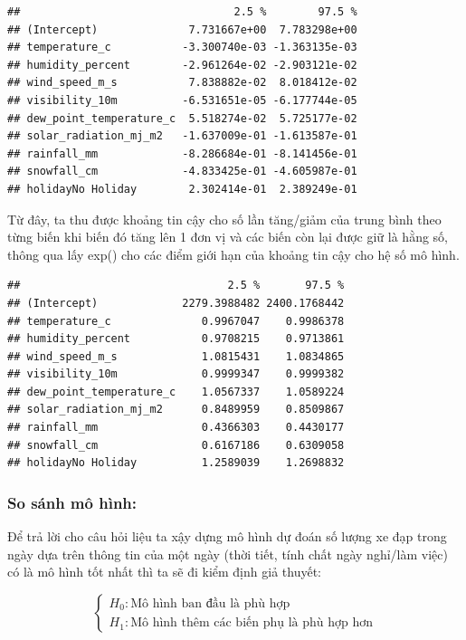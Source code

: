 \documentclass[
  11pt,
  letterpaper,
]{article}
\begin{document}
\begin{verbatim}
##                                 2.5 %        97.5 %
## (Intercept)              7.731667e+00  7.783298e+00
## temperature_c           -3.300740e-03 -1.363135e-03
## humidity_percent        -2.961264e-02 -2.903121e-02
## wind_speed_m_s           7.838882e-02  8.018412e-02
## visibility_10m          -6.531651e-05 -6.177744e-05
## dew_point_temperature_c  5.518274e-02  5.725177e-02
## solar_radiation_mj_m2   -1.637009e-01 -1.613587e-01
## rainfall_mm             -8.286684e-01 -8.141456e-01
## snowfall_cm             -4.833425e-01 -4.605987e-01
## holidayNo Holiday        2.302414e-01  2.389249e-01
\end{verbatim}

Từ đây, ta thu được khoảng tin cậy cho số lần tăng/giảm của trung bình theo từng biến khi biến đó tăng lên 1 đơn vị và các biến còn lại được giữ là hằng số, thông qua lấy exp() cho các điểm giới hạn của khoảng tin cậy cho hệ số mô hình.

\begin{verbatim}
##                                2.5 %       97.5 %
## (Intercept)             2279.3988482 2400.1768442
## temperature_c              0.9967047    0.9986378
## humidity_percent           0.9708215    0.9713861
## wind_speed_m_s             1.0815431    1.0834865
## visibility_10m             0.9999347    0.9999382
## dew_point_temperature_c    1.0567337    1.0589224
## solar_radiation_mj_m2      0.8489959    0.8509867
## rainfall_mm                0.4366303    0.4430177
## snowfall_cm                0.6167186    0.6309058
## holidayNo Holiday          1.2589039    1.2698832
\end{verbatim}

\subsubsection{So sánh mô hình:}

Để trả lời cho câu hỏi liệu ta xậy dựng mô hình dự đoán số lượng xe đạp trong ngày dựa trên thông tin của một ngày (thời tiết, tính chất ngày nghỉ/làm việc) có là mô hình tốt nhất thì ta sẽ đi kiểm định giả thuyết:

$$\begin{cases}
H_0 : \text{Mô hình ban đầu là phù hợp} \\
H_1 : \text{Mô hình thêm các biến phụ là phù hợp hơn}
\end{cases}$$
\end{document}
